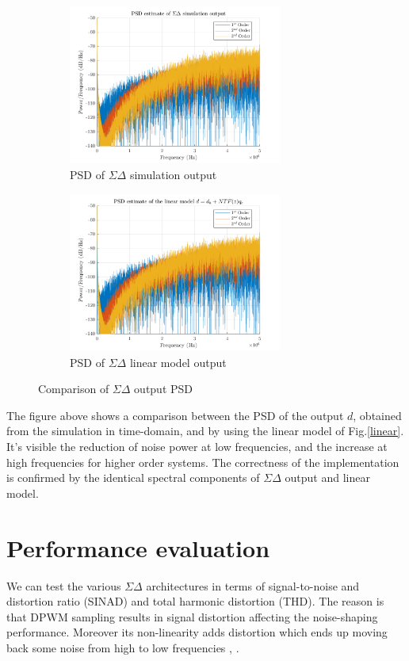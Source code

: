 \documentclass[11pt,a4paper]{article}
\begin{document}
\begin{figure}[H]
	\centering
	\begin{subfigure}[b]{0.45\textwidth}
		\centering
		\includegraphics[width=70mm]{images/psd_d_sim.png}
		\caption{PSD of $\Sigma\Delta$ simulation output}
		\label{sim}
	\end{subfigure}
	\begin{subfigure}[b]{0.45\textwidth}
		\centering
		\includegraphics[width=70mm]{images/psd_linmodel.png}
		\caption{PSD of $\Sigma\Delta$ linear model output}
		\label{lin}
	\end{subfigure}
	\caption{Comparison of $\Sigma\Delta$ output PSD}
	\label{psd comparison}
\end{figure}
The figure above shows a comparison between the PSD of the output $d$, obtained from the simulation in time-domain, and by using the linear model of Fig.\ref{linear}. It's visible the reduction of noise power at low frequencies, and the increase at high frequencies for higher order systems. The correctness of the implementation is confirmed by the identical spectral components of $\Sigma\Delta$ output and linear model.
\section{Performance evaluation}
We can test the various $\Sigma\Delta$ architectures in terms of signal-to-noise and distortion ratio (SINAD) and total harmonic distortion (THD). The reason is that DPWM sampling results in signal distortion affecting the noise-shaping performance. Moreover its non-linearity adds distortion which ends up moving back some noise from high to low frequencies \cite{norris2008quantization}, \cite{sato2007output}.
\end{document}
